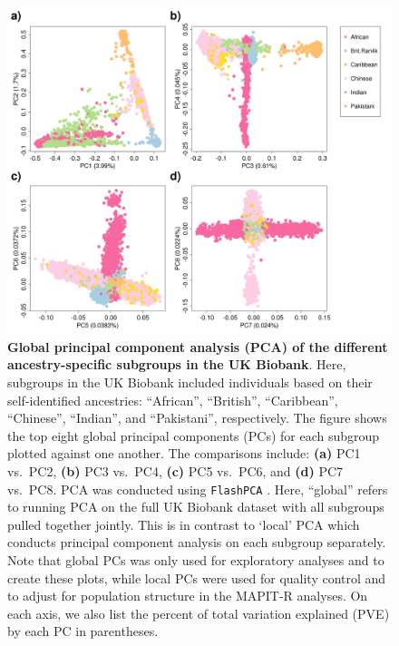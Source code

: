 \documentclass[10pt]{article}
\begin{document}
\begin{figure}[H]
\centering
\includegraphics[width = \textwidth]{Images/Supp/InterPath_Supp_Figure_UKB_PCAPlot_vs2.png}
\caption{\textbf{Global principal component analysis (PCA) of the different ancestry-specific subgroups in the UK Biobank}. Here, subgroups in the UK Biobank included individuals based on their self-identified ancestries: ``African'', ``British'', ``Caribbean'', ``Chinese'', ``Indian'', and ``Pakistani'', respectively. The figure shows the top eight global principal components (PCs) for each subgroup plotted against one another. The comparisons include: \textbf{(a)} PC1 vs.~PC2, \textbf{(b)} PC3 vs.~PC4, \textbf{(c)} PC5 vs.~PC6, and \textbf{(d)} PC7 vs.~PC8. PCA was conducted using \texttt{FlashPCA} \cite{Abraham2017}. Here, ``global'' refers to running PCA on the full UK Biobank dataset with all subgroups pulled together jointly. This is in contrast to `local' PCA which conducts principal component analysis on each subgroup separately. Note that global PCs was only used for exploratory analyses and to create these plots, while local PCs were used for quality control and to adjust for population structure in the MAPIT-R analyses. On each axis, we also list the percent of total variation explained (PVE) by each PC in parentheses.}
\label{InterPath-Supp-Figure-UKB-subgroups-PCAPlot}
\end{figure}
\clearpage
\end{document}
